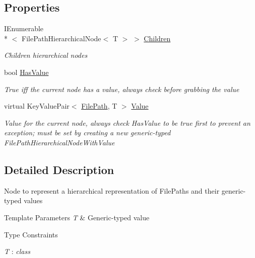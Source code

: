\subsection*{Properties}
\begin{DoxyCompactItemize}
\item 
I\-Enumerable\\*
$<$ File\-Path\-Hierarchical\-Node$<$ T $>$ $>$ \hyperlink{class_cloud_api_public_1_1_model_1_1_file_path_hierarchical_node_3_01_t_01_4_a6292b8bdd5edc395ce0cb6f242b6706c}{Children}
\begin{DoxyCompactList}\small\item\em Children hierarchical nodes \end{DoxyCompactList}\item 
bool \hyperlink{class_cloud_api_public_1_1_model_1_1_file_path_hierarchical_node_3_01_t_01_4_acdcd3b4c556b0a1760bef4ca6ef307db}{Has\-Value}
\begin{DoxyCompactList}\small\item\em True iff the current node has a value, always check before grabbing the value \end{DoxyCompactList}\item 
virtual Key\-Value\-Pair$<$ \hyperlink{class_cloud_api_public_1_1_model_1_1_file_path}{File\-Path}, T $>$ \hyperlink{class_cloud_api_public_1_1_model_1_1_file_path_hierarchical_node_3_01_t_01_4_ab5e262d004c21c69d34905bff7680e0d}{Value}
\begin{DoxyCompactList}\small\item\em Value for the current node, always check Has\-Value to be true first to prevent an exception; must be set by creating a new generic-\/typed File\-Path\-Hierarchical\-Node\-With\-Value \end{DoxyCompactList}\end{DoxyCompactItemize}


\subsection{Detailed Description}
Node to represent a hierarchical representation of File\-Paths and their generic-\/typed values 


\begin{DoxyTemplParams}{Template Parameters}
{\em T} & Generic-\/typed value\\
\hline
\end{DoxyTemplParams}
\begin{Desc}
\item[Type Constraints]\begin{description}
\item[{\em T} : {\em class}]\end{description}
\end{Desc}



